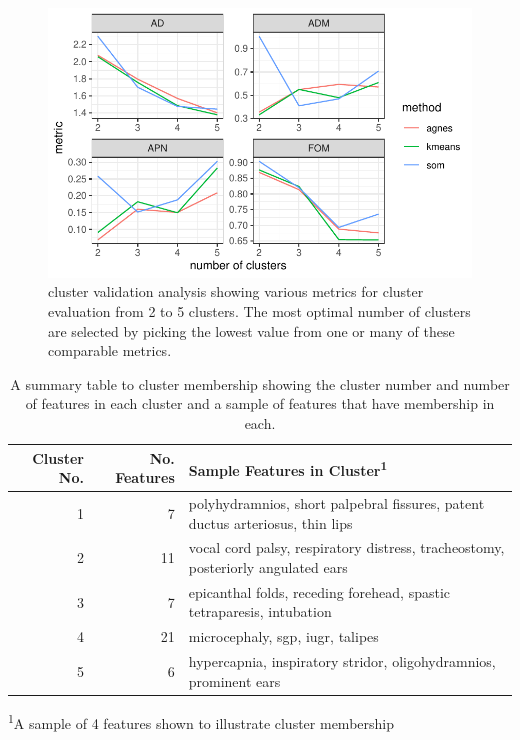 \documentclass[
  letterpaper,
  DIV=11,
  numbers=noendperiod]{scrartcl}
\begin{document}
\begin{figure}

{\centering \includegraphics{paper_files/figure-pdf/fig-clvalid-1.pdf}

}

\caption{\label{fig-clvalid}cluster validation analysis showing various
metrics for cluster evaluation from 2 to 5 clusters. The most optimal
number of clusters are selected by picking the lowest value from one or
many of these comparable metrics.}

\end{figure}

\hypertarget{tbl-clusttab}{}
\setlength{\LTpost}{0mm}
\begin{longtable}{rrl}
\caption{\label{tbl-clusttab}A summary table to cluster membership showing the cluster number and
number of features in each cluster and a sample of features that have
membership in each. }\tabularnewline

\toprule
Cluster No. & No. Features & Sample Features in Cluster\textsuperscript{1} \\ 
\midrule
1 & 7 & polyhydramnios, short palpebral fissures, patent ductus arteriosus, thin lips \\ 
2 & 11 & vocal cord palsy, respiratory distress, tracheostomy, posteriorly angulated ears \\ 
3 & 7 & epicanthal folds, receding forehead, spastic tetraparesis, intubation \\ 
4 & 21 & microcephaly, sgp, iugr, talipes \\ 
5 & 6 & hypercapnia, inspiratory stridor, oligohydramnios, prominent ears \\ 
\bottomrule
\end{longtable}
\begin{minipage}{\linewidth}
\textsuperscript{1}A sample of 4 features shown to illustrate cluster membership\\
\end{minipage}
\end{document}
